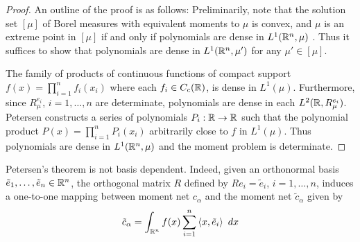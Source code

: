 \begin{proof}
  An outline of the proof is as follows: Preliminarily, note that the solution set $[\mu]$ of Borel measures with equivalent moments to $\mu$ is convex, and $\mu$ is an extreme point in $[\mu]$ if and only if polynomials are dense in $L^1(\mathbb{R}^n, \mu)$ \cite{A2021}. Thus it suffices to show that polynomials are dense in $L^1(\mathbb{R}^n, \mu')$ for any $\mu' \in [\mu]$.
  
  The family of products of continuous functions of compact support $f(x) = \prod_{i=1}^n f_i(x_i)$ where each $f_i \in C_c(\mathbb{R})$, is dense in $L^1(\mu)$. Furthermore, since $R_\mu^{e_i}$, $i = 1, \ldots, n$ are determinate, polynomials are dense in each $L^2(\mathbb{R}, R_\mu^{e_i})$. Petersen constructs a series of polynomials $P_i : \mathbb{R} \rightarrow \mathbb{R}$ such that the polynomial product $P(x) = \prod_{i = 1}^n P_i(x_i)$ arbitrarily close to $f$ in $L^1(\mu)$. Thus polynomials are dense in $L^1(\mathbb{R}^n, \mu)$ and the moment problem is determinate. 
\end{proof}

\begin{remark}
  Petersen's theorem is not basis dependent. Indeed, given an orthonormal basis $\tilde e_1, \ldots, \tilde e_n \in \mathbb{R}^n$, the orthogonal matrix $R$ defined by $Re_i = \tilde e_i$, $i = 1, \ldots, n$, induces a one-to-one mapping between moment net $c_\alpha$ and the moment net $\tilde c_\alpha$ given by
  \[
    \tilde c_\alpha = \int_{\mathbb{R}^n} f(x) \sum_{i = 1}^n \left\langle x, \tilde e_i \right\rangle ~dx
  \]
\end{remark}

  
  
